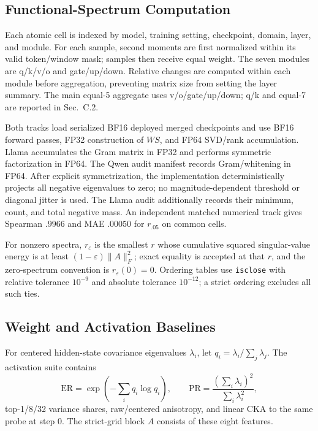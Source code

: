 \documentclass[letterpaper]{article} %
\begin{document}
\subsection{Functional-Spectrum Computation}

Each atomic cell is indexed by model, training setting, checkpoint, domain, layer, and
module. For each sample, second moments are first normalized within its valid token/window
mask; samples then receive equal weight. The seven modules are
q/k/v/o and gate/up/down. Relative changes are computed within each module before
aggregation, preventing matrix size from setting the layer summary. The main equal-5
aggregate uses v/o/gate/up/down; q/k and equal-7 are reported in Sec.~C.2.

Both tracks load serialized BF16 deployed merged checkpoints and use BF16 forward
passes, FP32 construction of $WS$, and FP64 SVD/rank accumulation. Llama accumulates
the Gram matrix in FP32 and performs symmetric factorization in FP64. The Qwen audit
manifest records Gram/whitening in FP64. After explicit symmetrization, the implementation
deterministically projects
all negative eigenvalues to zero; no magnitude-dependent threshold or diagonal jitter is
used. The Llama audit additionally records their minimum, count, and total negative mass.
An independent matched numerical track gives
Spearman $.9966$ and MAE $.00050$ for $r_{.05}$ on common cells.

For nonzero spectra, $r_\varepsilon$ is the smallest $r$ whose cumulative squared
singular-value energy is at least $(1-\varepsilon)\|A\|_F^2$; exact equality is accepted
at that $r$, and the zero-spectrum convention is $r_\varepsilon(0)=0$. Ordering tables
use \texttt{isclose} with relative tolerance $10^{-9}$ and absolute tolerance
$10^{-12}$; a strict ordering excludes all such ties.

\subsection{Weight and Activation Baselines}

For centered hidden-state covariance eigenvalues $\lambda_i$, let
$q_i=\lambda_i/\sum_j\lambda_j$. The activation suite contains
\begin{equation}
\mathrm{ER}=\exp\!\left(-\sum_iq_i\log q_i\right),\qquad
\mathrm{PR}=\frac{(\sum_i\lambda_i)^2}{\sum_i\lambda_i^2},
\end{equation}
top-1/8/32 variance shares, raw/centered anisotropy, and linear CKA to the same
probe at step 0. The strict-grid block $A$ consists of these eight features.
\end{document}
